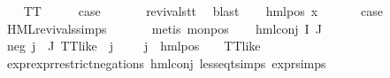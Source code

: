 \begin{isabellebody}
\ \ \isamarkupfalse%
\ TT\isanewline
\ \ \isamarkupfalse%
\ \isamarkupfalse%
\ {\isacharquery}{\kern0pt}case\ \isanewline
\ \ \ \ \isamarkupfalse%
\ revivals{\isacharunderscore}{\kern0pt}tt\ \isamarkupfalse%
\ blast\isanewline
{}\isamarkupfalse%
\isanewline
\ \ \isamarkupfalse%
\ {\isacharparenleft}{\kern0pt}hml{\isacharunderscore}{\kern0pt}pos\ x{}\ {\isasymphi}{\isacharparenright}{\kern0pt}\isanewline
\ \ \isamarkupfalse%
\ \isamarkupfalse%
\ {\isacharquery}{\kern0pt}case\ \isanewline
\ \ \ \ \isamarkupfalse%
\ HML{\isacharunderscore}{\kern0pt}revivals{\isachardot}{\kern0pt}simps\ \isanewline
\ \ \ \ \isamarkupfalse%
\ {\isacharparenleft}{\kern0pt}metis\ mon{\isacharunderscore}{\kern0pt}pos{\isacharparenright}{\kern0pt}\isanewline
{}\isamarkupfalse%
\isanewline
\ \ \isamarkupfalse%
\ {\isacharparenleft}{\kern0pt}hml{\isacharunderscore}{\kern0pt}conj\ I\ J\ {\isasymPhi}{\isacharparenright}{\kern0pt}\isanewline
\ \ \isamarkupfalse%
\ neg{\isacharcolon}{\kern0pt}\ {\isachardoublequoteopen}{\isacharparenleft}{\kern0pt}{\isasymforall}j\ {\isasymin}\ J{\isachardot}{\kern0pt}\ {\isacharparenleft}{\kern0pt}TT{\isacharunderscore}{\kern0pt}like\ {\isacharparenleft}{\kern0pt}{\isasymPhi}\ j{\isacharparenright}{\kern0pt}{\isacharparenright}{\kern0pt}\ {\isasymor}\ {\isacharparenleft}{\kern0pt}{\isasymexists}{\isasymalpha}\ {\isasymchi}{\isachardot}{\kern0pt}\ {\isacharparenleft}{\kern0pt}{\isacharparenleft}{\kern0pt}{\isasymPhi}\ j{\isacharparenright}{\kern0pt}\ {\isacharequal}{\kern0pt}\ hml{\isacharunderscore}{\kern0pt}pos\ {\isasymalpha}\ {\isasymchi}\ {\isasymand}\ {\isacharparenleft}{\kern0pt}TT{\isacharunderscore}{\kern0pt}like\ {\isasymchi}{\isacharparenright}{\kern0pt}{\isacharparenright}{\kern0pt}{\isacharparenright}{\kern0pt}{\isacharparenright}{\kern0pt}{\isachardoublequoteclose}\isanewline
\ \ \ \ \isamarkupfalse%
\ expr{\isacharunderscore}{\kern0pt}{}{\isacharunderscore}{\kern0pt}expr{\isacharunderscore}{\kern0pt}{}{\isacharunderscore}{\kern0pt}restrict{\isacharunderscore}{\kern0pt}negations\ hml{\isacharunderscore}{\kern0pt}conj{\isacharparenleft}{\kern0pt}{}{\isacharparenright}{\kern0pt}\ less{\isacharunderscore}{\kern0pt}eq{\isacharunderscore}{\kern0pt}t{\isachardot}{\kern0pt}simps\ expr{\isachardot}{\kern0pt}simps\isanewline
\ \ \ \ \isamarkupfalse%

\end{isabellebody}
